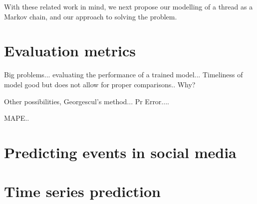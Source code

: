 
With these related work in mind, we next propose our modelling of a thread as a 
Markov chain, and our approach to solving the problem.


\section{Evaluation metrics}

Big problems... evaluating the performance of a trained model...
Timeliness of model good but does not allow for proper comparisons.. Why?

Other possibilities, Georgescul's method... Pr Error.... 

MAPE..

\section{Predicting events in social media}


\section{Time series prediction}




